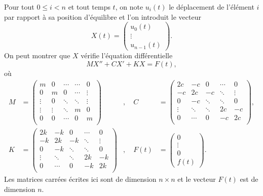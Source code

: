Pour tout $0 \leq i < n$ et tout temps $t$, on note $u_i(t)$ le déplacement de l'élément \no$i$ par rapport à sa position d'équilibre et l'on introduit le vecteur 
\begin{equation*}
  X(t) = \begin{pmatrix} u_0(t) \\ \vdots \\ u_{n-1}(t) \end{pmatrix}.
\end{equation*}
On peut montrer que $X$ vérifie l'équation différentielle 
\begin{equation*}
  MX'' + CX' + KX = F(t),
\end{equation*}
où
\begin{align*}
  M &= \begin{pmatrix} m & 0  & \cdots&\cdots & 0\\
0 & m  & 0 & \cdots & \vdots\\
\vdots & 0  & \ddots & \ddots & \vdots\\
\vdots & \vdots  &\ddots & m & 0\\
0 & 0  &  \cdots & 0 & m\\ \end{pmatrix}&,
\quad C &= \begin{pmatrix} 2c & -c  & 0&\cdots & 0\\
-c & 2c  & -c & \ddots & \vdots\\
0 & -c  & \ddots & \ddots & 0\\
\vdots & \ddots  &\ddots & 2c & -c\\
0 &  \cdots  &  0 & -c & 2c\\ \end{pmatrix}, \\
K &= \begin{pmatrix} 2k & -k  & 0&\cdots & 0\\
-k & 2k  & -k & \ddots & \vdots\\
0 & -k  & \ddots & \ddots & 0\\
\vdots & \ddots  &\ddots & 2k & -k\\
0 &  \cdots  &  0 & -k & 2k\\ \end{pmatrix}&,
\quad
F(t) &= \begin{pmatrix} 0 \\ \vdots \\ 0 \\ f(t) \end{pmatrix}.
\end{align*}
Les matrices carrées écrites ici sont de dimension $n\times n$ et le vecteur $F(t)$ est de dimension $n$. 

